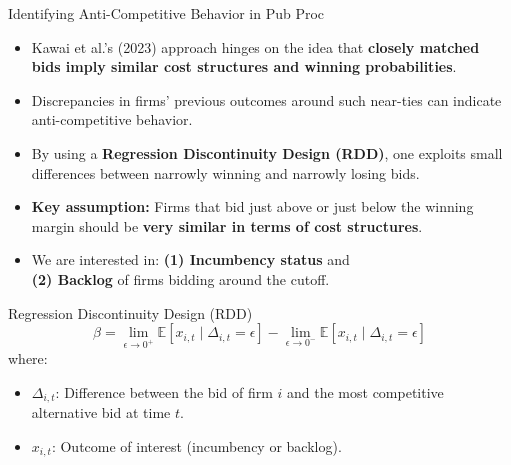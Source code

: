 \documentclass{beamer}
\begin{document}
\begin{frame}{Identifying Anti-Competitive Behavior in Pub Proc}
\begin{itemize}
  \item Kawai et al.'s (2023) approach hinges on the idea that \textbf{closely matched bids imply similar cost structures and winning probabilities}. \vspace{2mm}
  \item Discrepancies in firms' previous outcomes around such near-ties can indicate anti-competitive behavior. \pause \vspace{2mm}
  \item By using a \textbf{Regression Discontinuity Design (RDD)}, one exploits small differences between narrowly winning and narrowly losing bids. \vspace{2mm}
  \item \textbf{Key assumption:} Firms that bid just above or just below the winning margin should be \textbf{very similar in terms of cost structures}. \pause \vspace{2mm}
  \item We are interested in: \textbf{(1) Incumbency status} and \\ \textbf{(2) Backlog} of firms bidding around the cutoff.
\end{itemize}
\end{frame}

\begin{frame}{Regression Discontinuity Design (RDD)}
\[
\beta = \lim_{\epsilon \to 0^+} \mathbb{E}\!\left[x_{i,t} \mid \Delta_{i,t} = \epsilon\right]
   - \lim_{\epsilon \to 0^-} \mathbb{E}\!\left[x_{i,t} \mid \Delta_{i,t} = \epsilon\right]
\]
where:
\begin{itemize}
  \item \( \Delta_{i,t} \): Difference between the bid of firm \( i \) and the most competitive alternative bid at time \( t \).
  \item \( x_{i,t} \): Outcome of interest (incumbency or backlog).
\end{itemize}
\end{frame}
\end{document}
